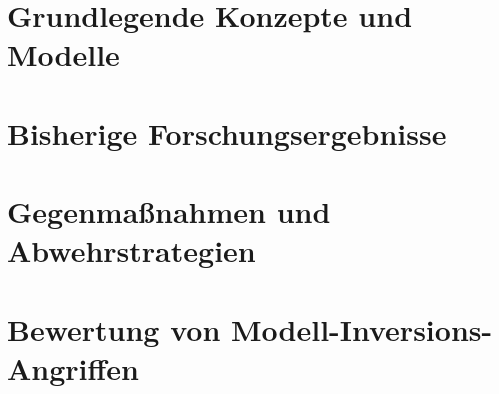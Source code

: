 \section{Grundlegende Konzepte und Modelle}\label{chpt:Stand_der_Technik_MI}
\section{Bisherige Forschungsergebnisse}
\section{Gegenmaßnahmen und Abwehrstrategien}\label{chpt:DefenseMI}
\section{Bewertung von Modell-Inversions-Angriffen}
